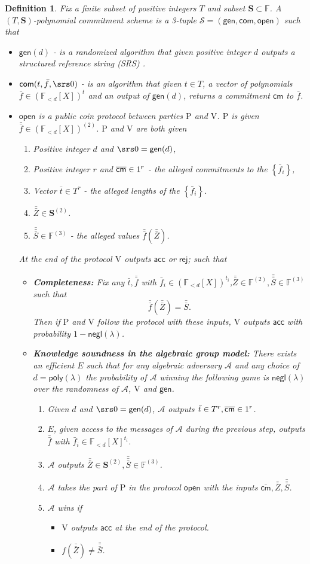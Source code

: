 \documentclass[11pt]{article} %
\newcommand{\F}{\ensuremath{\mathbb F}\xspace}
\newcommand{\adv}{\ensuremath{\mathcal A}\xspace}
\newcommand{\com}{\ensuremath{\mathsf{com}}\xspace}
\newcommand{\cm}{\ensuremath{\mathsf{cm}}\xspace}
\newcommand{\cmm}{\ensuremath{\mathsf{\overline{cm}}}\xspace}
\newcommand{\open}{\ensuremath{\mathsf{open}}\xspace}
\newcommand{\negl}{\ensuremath{\mathsf{negl}(\lambda)}\xspace}
\newcommand{\rej}{\ensuremath{\mathsf{rej}}\xspace}
\newcommand{\acc}{\ensuremath{\mathsf{acc}}\xspace}
\newcommand{\gen}{\ensuremath{\mathsf{gen}}\xspace}
\newcommand{\prvpc}{\ensuremath{\mathrm{P}}\xspace}%
\newcommand{\verpc}{\ensuremath{\mathrm{V}}\xspace}%
\newcommand{\ext}{\ensuremath{E}\xspace}
\newcommand{\set}[1]{\ensuremath{\left\{#1\right\}}\xspace}
\newcommand{\polysofdeg}[1]{\ensuremath{\F_{< #1}[X]}\xspace}
\newcommand{\polyvecs}[2]{\ensuremath{(\F_{< #1}[X])^{#2}}\xspace}
\newcommand{\PCscheme}{\ensuremath{\mathscr{S}}\xspace}
\newtheorem{dfn}[lemma]{Definition}
\newcommand{\poly}{\ensuremath{\mathsf{poly(\lambda)}}\xspace}
\newcommand{\openset}{\ensuremath{\mathbf{S}}\xspace}
\newcommand{\f}{\ensuremath{\bar{f}}\xspace}
\renewcommand{\t}{\ensuremath{\bar{t}}\xspace}
\newcommand{\ff}{\ensuremath{\bar{\bar{f}}}\xspace}
\newcommand{\ZZ}{\ensuremath{\bar{\bar{Z}}}\xspace}
\renewcommand{\SS}{\ensuremath{\bar{\bar{S}}}\xspace}
\newcommand{\SSS}{\ensuremath{\bar{\bar{\bar{S}}}}\xspace}
\newcommand{\rects}{\ensuremath{\F^{(2)}}\xspace}
\newcommand{\opensetrects}{\ensuremath{\openset^{(2)}}\xspace}
\newcommand{\cubes}{\ensuremath{\F^{(3)}}\xspace}
\begin{document}
\begin{dfn}\label{dfn:PCscheme}
Fix a finite subset of positive integers $T$ and subset $\openset\subset \F$.
A $(T,\openset)$-polynomial commitment scheme is a 3-tuple $\PCscheme = (\gen,\com,\open)$ such that
\begin{itemize}
 \item $\gen(d)$ -  is a randomized algorithm that given positive integer $d$ outputs a structured reference string (SRS) .
 \item $\com(t,\f,\srs0)$ - is an algorithm that given $t\in T$, a vector of polynomials $\f \in \polyvecs{d}{t}$  and an output  of $\gen(d)$,  returns a commitment \cm to \f.
 \item \open is a public coin protocol between parties \prvpc and \verpc. \prvpc is given $ \ff \in \left(\polysofdeg{d}\right)^{(2)}$.  \prvpc and \verpc are both given

 \begin{enumerate}
  \item  Positive integer $d$ and  $\srs0=\gen(d)$,
  \item  Positive integer $r$ and $\cmm\in \G1^r$ - the alleged commitments to the $\set{\f_i}$,
  \item Vector $\t \in T^r$ - the alleged lengths of the \set{\f_i}.
  \item $\ZZ\in \opensetrects$.
  \item $\SSS\in \cubes$ - the alleged values $\ff(\ZZ)$.
 \end{enumerate}
 
 At the end of the protocol \verpc outputs \acc or \rej;
such that
\begin{itemize}
 \item \textbf{Completeness:} Fix any  $\t,\ff$ with $\f_i\in \polyvecs{d}{t_i}$,$\ZZ\in \rects,\SSS\in\cubes$ such that  
\[\ff(\ZZ)=\SS.\]
Then if \prvpc and \verpc follow the protocol with these inputs, \verpc outputs \acc with probability $1-\negl$.
 \item \textbf{Knowledge soundness in the algebraic group model:} There exists an efficient \ext such that for any algebraic adversary \adv and any choice of $d=\poly$ the probability of \adv winning the following game is \negl over the randomness of \adv, \verpc and \gen.
 \begin{enumerate}
  \item Given $d$ and $\srs0=\gen(d)$, \adv outputs $\t\in T^r, \cmm\in  \G1^r$.
  \item \ext, given access to the messages of \adv during the previous step, outputs $\ff$ with $\f_i \in \polysofdeg{d}^{t_i}$.
  \item \adv outputs $\ZZ\in \opensetrects,\SSS\in \cubes$.
  \item \adv takes the part of \prvpc in the protocol \open with the inputs
  $\cmm,\ZZ,\SSS$.
  \item $\adv$ wins if
  \begin{itemize}
   \item \verpc outputs \acc at the end of the protocol.
   \item $f(\ZZ)\neq\SSS$.
  \end{itemize}


\end{enumerate}
\end{itemize}
\end{itemize}
\end{dfn}
\end{document}
